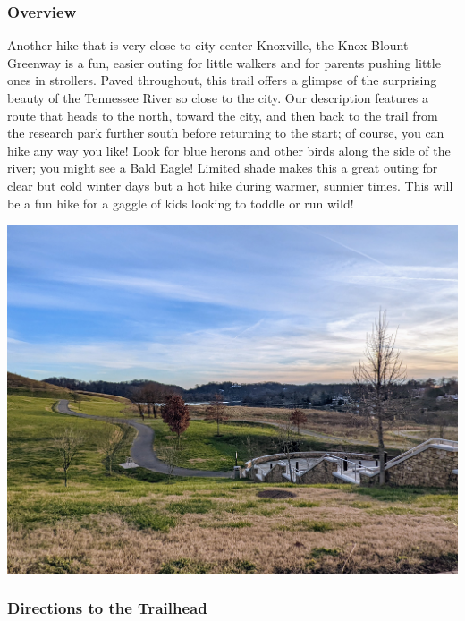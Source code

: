\documentclass[
  letterpaper,
  DIV=11,
  numbers=noendperiod]{scrartcl}
\begin{document}
\hypertarget{overview-5}{%
\subsubsection{Overview}\label{overview-5}}

Another hike that is very close to city center Knoxville, the
Knox-Blount Greenway is a fun, easier outing for little walkers and for
parents pushing little ones in strollers. Paved throughout, this trail
offers a glimpse of the surprising beauty of the Tennessee River so
close to the city. Our description features a route that heads to the
north, toward the city, and then back to the trail from the research
park further south before returning to the start; of course, you can
hike any way you like! Look for blue herons and other birds along the
side of the river; you might see a Bald Eagle! Limited shade makes this
a great outing for clear but cold winter days but a hot hike during
warmer, sunnier times. This will be a fun hike for a gaggle of kids
looking to toddle or run wild!

\includegraphics{img/trail-06-figure-01.jpg}

\hypertarget{directions-to-the-trailhead-5}{%
\subsubsection{Directions to the
Trailhead}\label{directions-to-the-trailhead-5}}
\end{document}
